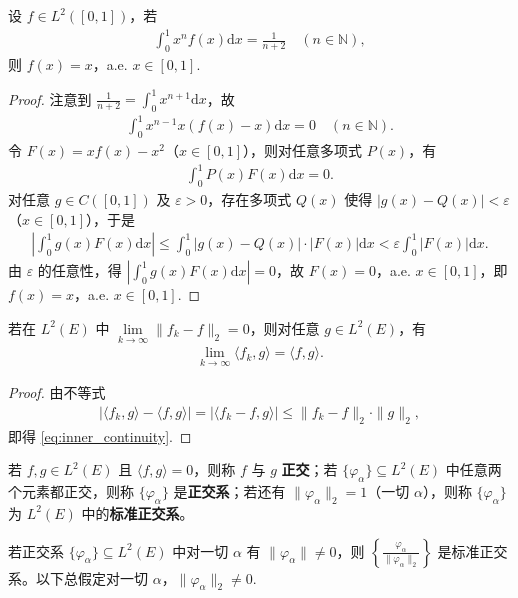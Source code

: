 \documentclass[../../main.tex]{subfiles}%
\begin{document}
\begin{example}
设 $f \in L^2([0,1])$，若
\begin{align*}
\int_0^1 x^n f(x) \mathrm{d}x = \frac{1}{n+2} \quad (n \in \mathbb{N}),
\end{align*}
则 $f(x) = x$，a.e. $x \in [0,1]$.
\end{example}
\begin{proof}

注意到 $\frac{1}{n+2} = \int_0^1 x^{n+1} \mathrm{d}x$，故
\begin{align*}
\int_0^1 x^{n-1} x(f(x) - x) \mathrm{d}x = 0 \quad (n \in \mathbb{N}).
\end{align*}
令 $F(x) = xf(x) - x^2$（$x \in [0,1]$），则对任意多项式 $P(x)$，有
\begin{align*}
\int_0^1 P(x) F(x) \mathrm{d}x = 0.
\end{align*}
对任意 $g \in C([0,1])$ 及 $\varepsilon > 0$，存在多项式 $Q(x)$ 使得 $|g(x) - Q(x)| < \varepsilon$（$x \in [0,1]$），于是
\begin{align*}
\left| \int_0^1 g(x) F(x) \mathrm{d}x \right| \leqslant \int_0^1 |g(x) - Q(x)| \cdot |F(x)| \mathrm{d}x < \varepsilon \int_0^1 |F(x)| \mathrm{d}x.
\end{align*}
由 $\varepsilon$ 的任意性，得 $\left| \int_0^1 g(x) F(x) \mathrm{d}x \right| = 0$，故 $F(x) = 0$，a.e. $x \in [0,1]$，即 $f(x) = x$，a.e. $x \in [0,1]$.

\end{proof}

\begin{theorem}[内积的连续性]
若在 $L^2(E)$ 中 $\lim\limits_{k \to \infty} \|f_k - f\|_2 = 0$，则对任意 $g \in L^2(E)$，有
\begin{align}
\lim\limits_{k \to \infty} \langle f_k, g \rangle = \langle f, g \rangle. \label{eq:inner_continuity}
\end{align}
\end{theorem}
\begin{proof}

由不等式
\begin{align*}
|\langle f_k, g \rangle - \langle f, g \rangle| = |\langle f_k - f, g \rangle| \leqslant \|f_k - f\|_2 \cdot \|g\|_2,
\end{align*}
即得 \eqref{eq:inner_continuity}.

\end{proof}

\begin{definition}
若 $f, g \in L^2(E)$ 且 $\langle f, g \rangle = 0$，则称 $f$ 与 $g$ \textbf{正交}；若 $\{\varphi_\alpha\} \subseteq L^2(E)$ 中任意两个元素都正交，则称 $\{\varphi_\alpha\}$ 是\textbf{正交系}；若还有 $\|\varphi_\alpha\|_2 = 1$（一切 $\alpha$），则称 $\{\varphi_\alpha\}$ 为 $L^2(E)$ 中的\textbf{标准正交系}。
\end{definition}
\begin{remark}
若正交系 $\{\varphi_\alpha\} \subseteq L^2(E)$ 中对一切 $\alpha$ 有 $\|\varphi_\alpha\| \neq 0$，则 $\left\{ \frac{\varphi_\alpha}{\|\varphi_\alpha\|_2} \right\}$ 是标准正交系。以下总假定对一切 $\alpha$，$\|\varphi_\alpha\|_2 \neq 0$.
\end{remark}
\end{document}
